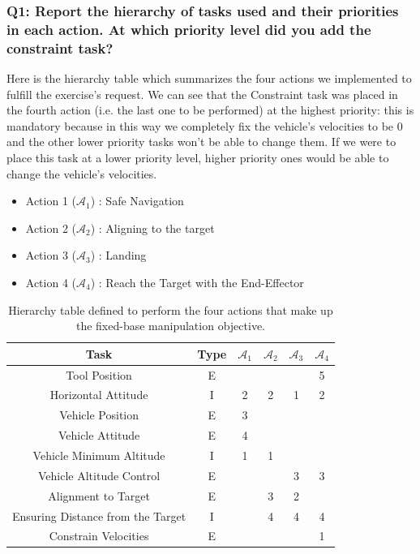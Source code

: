 \documentclass{article}
\begin{document}
\subsubsection{Q1: Report the hierarchy of tasks used and their priorities in each action. At which priority level did you add the constraint task?}
Here is the hierarchy table which summarizes the four actions we implemented to fulfill the exercise's request. We can see that the Constraint task was placed in the fourth action (i.e. the last one to be performed) at the highest priority: this is mandatory because in this way we completely fix the vehicle's velocities to be 0 and the other lower priority tasks won't be able to change them. If we were to place this task at a lower priority level, higher priority ones would be able to change the vehicle's velocities.

\begin{table}[htb]
	\caption{Hierarchy table defined to perform the four actions that make up the fixed-base manipulation objective.}
	\begin{itemize}
		\item Action 1 ($\mathcal{A}_{1}$) : Safe Navigation
		\item Action 2 ($\mathcal{A}_{2}$) : Aligning to the target
		\item Action 3 ($\mathcal{A}_{3}$) : Landing
		\item Action 4 ($\mathcal{A}_{4}$) : Reach the Target with the End-Effector
	\end{itemize}
	\label{tb5:ex4.1.1HierarchyTable}
	\begin{center}
		\footnotesize
		\begin{tabular}{cccccc}
			\toprule
			Task & Type & $\mathcal{A}_{1}$ & $\mathcal{A}_{2}$ & $\mathcal{A}_{3}$ & $\mathcal{A}_{4}$ \\
			\midrule
			Tool Position                     & E &   &   &   & 5 \\
			\hdashline
			Horizontal Attitude               & I & 2 & 2 & 1 & 2 \\
			\hdashline
			Vehicle Position                  & E & 3 &   &   &   \\
			\hdashline
			Vehicle Attitude                  & E & 4 &   &   &   \\
			\hdashline
			Vehicle Minimum Altitude          & I & 1 & 1 &   &   \\
			\hdashline
			Vehicle Altitude Control          & E &   &   & 3 & 3 \\
			\hdashline
			Alignment to Target               & E &   & 3 & 2 &   \\
			\hdashline
			Ensuring Distance from the Target & I &   & 4 & 4 & 4 \\
			\hdashline
			Constrain Velocities              & E &   &   &   & 1 \\
			\bottomrule
		\end{tabular}
	\end{center}
\end{table}
\end{document}
